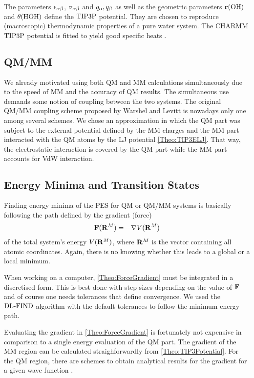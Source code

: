 \documentclass[8.5pt,twoside,twocolumn]{article}
\newcommand\dlfind{\enmat{\te{DL-FIND}}}
\renewcommand\r{\bo r}
\theoremstyle{standard}
\begin{document}
The parameters $\epsilon_{\alpha\beta}$, $\sigma_{\alpha\beta}$ and $q_{\alpha}, q_{\beta}$ as well as the geometric parameters
$\r(\te{OH})$ and $\theta(\text{HOH})$ define the $\text{TIP3P}$ potential. They are chosen to reproduce
(macroscopic) thermodynamic properties of a pure water system.
The CHARMM $\text{TIP3P}$
potential is fitted to yield good specific heats \cite{MacKerell1998CHARMMTIP3}.  

\subsection{QM/MM}
\label{Sec:Theo:QMMM}

We already motivated using both QM and MM calculations simultaneously due to
the speed of MM and the accuracy of QM results. The simultaneous use
demands some notion of coupling between the two systems. The original
QM/MM coupling scheme proposed by Warshel and Levitt \cite{Warshel1976QMMM}
is nowadays only one among several schemes.
We chose an approximation
in which the QM part was subject to the external potential defined
by the MM charges and the MM part interacted with the QM atoms by
the LJ potential \eqref{Theo:TIP3ELJ}. That way, the electrostatic
interaction is covered by the QM part while the MM part accounts for
VdW interaction.

\subsection{Energy Minima and Transition States}
\label{Sec:Theo:Minima}
Finding energy minima of the PES for QM or QM/MM systems is basically following
the path defined by the gradient (force)
\newcommand\RM{\enmat{\bo R^M}}
\begin{equation}
\bo F(\RM)=-\nabla V(\RM)
\label{Theo:ForceGradient}
\end{equation}
of the total system's energy $V(\RM)$, where $\RM$ is the vector containing
all atomic coordinates. Again, there is no knowing whether this leads to
a global or a local minimum.

When working on a computer, \eqref{Theo:ForceGradient} must be integrated
in a discretised form. This is best done with step sizes depending on the
value of $\mathbf{F}$ and of course one needs tolerances that define convergence.
We used the $\dlfind$ algorithm \cite{Kaestner2009} with the default tolerances
to follow the minimum energy path.

Evaluating the gradient in \eqref{Theo:ForceGradient} is fortunately not
expensive in comparison to a single energy evaluation of the QM part. The gradient of
the MM region can be calculated straighforwardly from \eqref{Theo:TIP3Potential}.
For the QM region, there are schemes to obtain analytical results for the gradient
for a given wave function \cite{Brorsen2014AnalyticalGradientDFT}.
\end{document}
